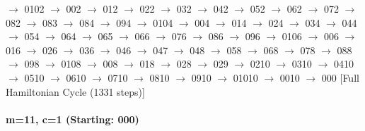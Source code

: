 $\rightarrow$ 0102 $\rightarrow$ 002 $\rightarrow$ 012 $\rightarrow$ 022 $\rightarrow$ 032 $\rightarrow$ 042 $\rightarrow$ 052 $\rightarrow$ 062 $\rightarrow$ 072 $\rightarrow$ 082 $\rightarrow$ 083 $\rightarrow$ 084 $\rightarrow$ 094 $\rightarrow$ 0104 $\rightarrow$ 004 $\rightarrow$ 014 $\rightarrow$ 024 $\rightarrow$ 034 $\rightarrow$ 044 $\rightarrow$ 054 $\rightarrow$ 064 $\rightarrow$ 065 $\rightarrow$ 066 $\rightarrow$ 076 $\rightarrow$ 086 $\rightarrow$ 096 $\rightarrow$ 0106 $\rightarrow$ 006 $\rightarrow$ 016 $\rightarrow$ 026 $\rightarrow$ 036 $\rightarrow$ 046 $\rightarrow$ 047 $\rightarrow$ 048 $\rightarrow$ 058 $\rightarrow$ 068 $\rightarrow$ 078 $\rightarrow$ 088 $\rightarrow$ 098 $\rightarrow$ 0108 $\rightarrow$ 008 $\rightarrow$ 018 $\rightarrow$ 028 $\rightarrow$ 029 $\rightarrow$ 0210 $\rightarrow$ 0310 $\rightarrow$ 0410 $\rightarrow$ 0510 $\rightarrow$ 0610 $\rightarrow$ 0710 $\rightarrow$ 0810 $\rightarrow$ 0910 $\rightarrow$ 01010 $\rightarrow$ 0010 $\rightarrow$ 000 [Full Hamiltonian Cycle (1331 steps)]

\paragraph{m=11, c=1 (Starting: 000)}


